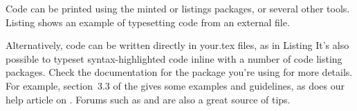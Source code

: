 Code can be printed using the minted or listings packages, or several other tools.
Listing  shows an example of typesetting code from an external file.

Alternatively, code can be written directly in your.tex files, as in Listing 
It's also possible to typeset syntax-highlighted code inline with a number of code listing packages.
Check the documentation for the package you're using for more details.
For example, section~3.3 of the  
gives some examples and guidelines, as does our help article on
 .
  Forums such as 
   and  are also a great source of tips.

